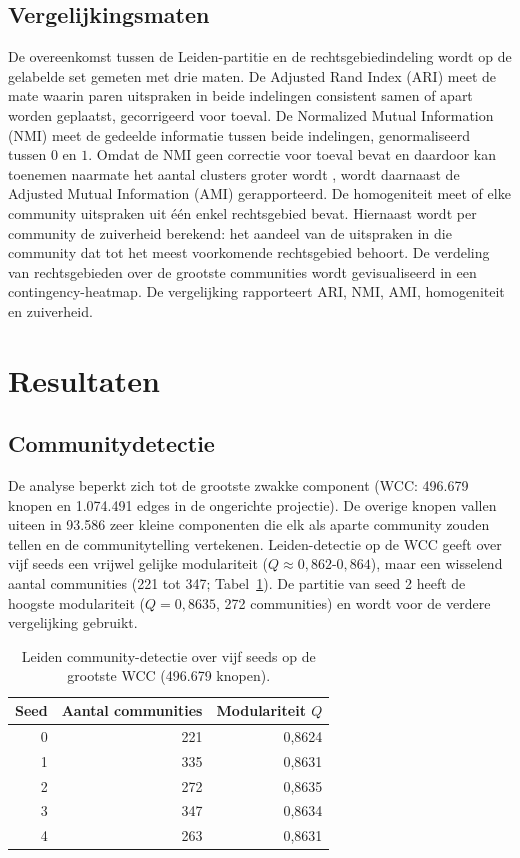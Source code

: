 \documentclass[a4paper, 12pt]{report}
\begin{document}
\subsection{Vergelijkingsmaten} De overeenkomst tussen de Leiden-partitie en de rechtsgebiedindeling wordt op de gelabelde set gemeten met drie maten. De Adjusted Rand Index (ARI) \parencite{hubert1985} meet de mate waarin paren uitspraken in beide indelingen consistent samen of apart worden geplaatst, gecorrigeerd voor toeval. De Normalized Mutual Information (NMI) \parencite{Danon_2005} meet de gedeelde informatie tussen beide indelingen, genormaliseerd tussen $0$ en $1$. Omdat de NMI geen correctie voor toeval bevat en daardoor kan toenemen naarmate het aantal clusters groter wordt \parencite{vinh2009}, wordt daarnaast de Adjusted Mutual Information (AMI) gerapporteerd. De homogeniteit \parencite{rosenberg2007} meet of elke community uitspraken uit één enkel rechtsgebied bevat. Hiernaast wordt per community de zuiverheid berekend: het aandeel van de uitspraken in die community dat tot het meest voorkomende rechtsgebied behoort. De verdeling van rechtsgebieden over de grootste communities wordt gevisualiseerd in een contingency-heatmap. De vergelijking rapporteert ARI, NMI, AMI, homogeniteit en zuiverheid.


\section{Resultaten}

\subsection{Communitydetectie}
De analyse beperkt zich tot de grootste zwakke component (WCC: 496.679 knopen en 1.074.491 edges in de ongerichte projectie). De overige knopen vallen uiteen in 93.586 zeer kleine componenten die elk als aparte community zouden tellen en de communitytelling vertekenen. Leiden-detectie op de WCC geeft over vijf seeds een vrijwel gelijke modulariteit ($Q \approx 0{,}862$-$0{,}864$), maar een wisselend aantal communities (221 tot 347; Tabel~\ref{tab:dv4-leiden}). De partitie van seed 2 heeft de hoogste modulariteit ($Q = 0{,}8635$, 272 communities) en wordt voor de verdere vergelijking gebruikt.

\begin{table}[ht]
  \centering
  \caption{Leiden community-detectie over vijf seeds op de grootste WCC (496.679 knopen).}
  \label{tab:dv4-leiden}
  \begin{tabular}{rrr}
    \toprule
    Seed & Aantal communities & Modulariteit $Q$ \\
    \midrule
    0 & 221 & 0,8624 \\
    1 & 335 & 0,8631 \\
    2 & 272 & 0,8635 \\
    3 & 347 & 0,8634 \\
    4 & 263 & 0,8631 \\
    \bottomrule
  \end{tabular}
\end{table}
\end{document}
